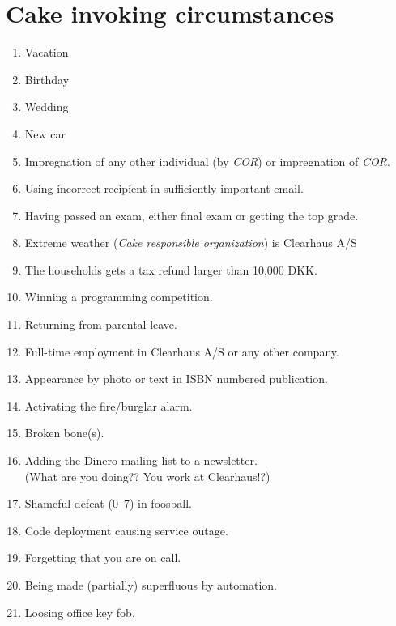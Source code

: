 \documentclass[a4paper, oneside, article]{memoir}
\newcounter{tbc}
\begin{document}
\chapter{Cake invoking circumstances}\label{chp:circumstances}
\begin{enumerate}[§ 1]
  \setcounter{enumi}{\value{tbc}}

  \item Vacation
  \item Birthday
  \item Wedding
  \item New car
  \item Impregnation of any other individual (by \emph{COR}) or impregnation of
    \emph{COR}.
  \item Using incorrect recipient in sufficiently important email.
  \item Having passed an exam, either final exam or getting the top grade.
  \item Extreme weather (\emph{Cake responsible organization}) is Clearhaus A/S
  \item The households gets a tax refund larger than 10,000 DKK\@.
  \item Winning a programming competition.
  \item Returning from parental leave.
  \item Full-time employment in Clearhaus A/S or any other company.
  \item Appearance by photo or text in ISBN numbered publication.
  \item Activating the fire/burglar alarm.
  \item Broken bone(s).
  \item Adding the Dinero mailing list to a newsletter.\\
    {\tiny (What are you doing?? You work at Clearhaus!?)}
  \item Shameful defeat (0--7) in foosball.
  \item Code deployment causing service outage.
  \item Forgetting that you are on call.
  \item Being made (partially) superfluous by automation.
  \item Loosing office key fob.
\end{enumerate}
\end{document}

